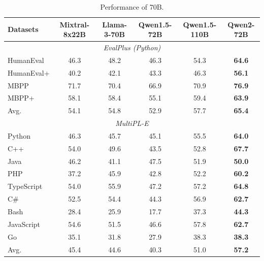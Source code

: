 \begin{table}[t]
\centering
\caption{Performance of 70B.}
\label{tab:code-70}
\setlength{\tabcolsep}{5pt}
\begin{tabular}{@{}l|ccccc@{}}
\toprule
\textbf{Datasets} &\textbf{Mixtral-8x22B}   & \textbf{Llama-3-70B} & \textbf{Qwen1.5-72B} & \textbf{Qwen1.5-110B} &\textbf{Qwen2-72B} \\
\midrule
\multicolumn{6}{c}{\textit{EvalPlus (Python)}} \\
\midrule
HumanEval & 46.3  & 48.2  & 46.3 & 54.3 & \textbf{64.6} \\
HumanEval+ & 40.2  & 42.1 & 43.3 & 46.3 & \textbf{56.1} \\
MBPP       & 71.7  & 70.4 & 66.9 & 70.9 & \textbf{76.9} \\
MBPP+     & 58.1  & 58.4 & 55.1 & 59.4 & \textbf{63.9} \\
\midrule
Avg. & 54.1 & 54.8 & 52.9 & 57.7 & \textbf{65.4} \\
\midrule
\multicolumn{6}{c}{\textit{MultiPL-E}} \\
\midrule
Python      & 46.3  & 45.7 & 45.1 & 55.5 & \textbf{64.0} \\
C++         & 54.0  & 49.6 & 43.5 & 52.8 & \textbf{67.7} \\
Java        & 46.2  & 41.1 & 47.5 & 51.9 & \textbf{50.0} \\
PHP         & 37.2  & 45.9 &  42.8 & 52.2 &\textbf{60.2} \\
TypeScript  & 54.0  & 55.9 &  47.2 & 57.2  & \textbf{64.8} \\
C\#          & 52.5  & 54.4 & 44.3 & 56.9  & \textbf{62.7} \\
Bash        & 28.4 & 25.9 & 17.7 & 37.3 & \textbf{44.3} \\
JavaScript  & 54.6 & 51.5 &  46.6 & 57.8 &  \textbf{62.7} \\
Go          & 35.1  & 31.8 & 27.9 & 38.3 & \textbf{38.3} \\
\midrule
Avg.        & 45.4  & 44.6  & 40.3 & 51.0 & \textbf{57.2} \\
\bottomrule
\end{tabular}
\end{table}

